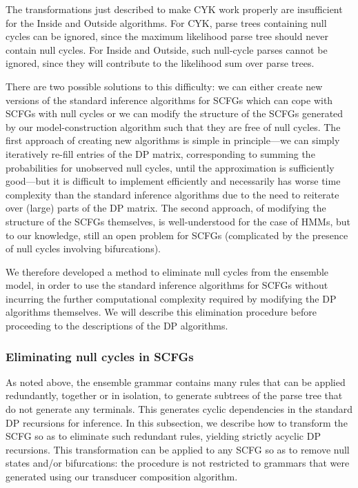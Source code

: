\documentclass[10pt]{article}
\begin{document}
The transformations just described to make CYK work properly are insufficient for the
Inside and Outside algorithms.
For CYK, parse trees containing null cycles can be ignored, since the maximum likelihood parse tree should never contain null cycles.
For Inside and Outside, such null-cycle parses cannot be ignored, since they will contribute to the likelihood sum over parse trees.

There are two possible solutions to this difficulty: we can either
create new versions of the standard inference algorithms for SCFGs
which can cope with SCFGs with null cycles or we can modify the
structure of the SCFGs generated by our model-construction algorithm
such that they are free of null cycles.  The first approach of
creating new algorithms is simple in principle---we can simply
iteratively re-fill entries of the DP matrix, corresponding to summing
the probabilities for unobserved null cycles, until the approximation
is sufficiently good---but it is difficult to implement efficiently
and necessarily has worse time complexity than the standard inference
algorithms due to the need to reiterate over (large) parts of the DP
matrix.  The second approach, of modifying the structure of the SCFGs
themselves, is well-understood for the case of HMMs, but to our
knowledge, still an open problem for SCFGs
(complicated by the presence of null cycles involving bifurcations).

We therefore developed a method to eliminate null cycles from
the ensemble model, in order to use the standard inference algorithms
for SCFGs without incurring the further computational complexity
required by modifying the DP algorithms themselves.
We will describe this elimination procedure before proceeding to the descriptions of the DP algorithms.


\subsubsection*{Eliminating null cycles in SCFGs}

As noted above, the ensemble grammar contains many rules that can be applied redundantly,
together or in isolation, to generate subtrees of the parse tree that do
not generate any terminals.
This generates cyclic dependencies in the standard DP recursions for inference.
In this subsection, we describe how to transform the SCFG so as to eliminate such redundant rules, yielding strictly acyclic DP recursions.
This transformation can be applied to any SCFG so as to remove null states and/or bifurcations:
the procedure is not restricted to grammars that were generated using our transducer composition algorithm.
\end{document}
